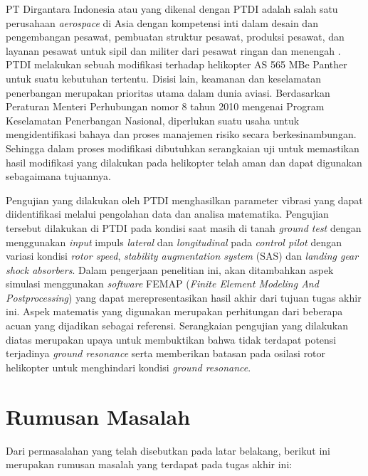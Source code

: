 PT Dirgantara Indonesia atau yang dikenal dengan PTDI adalah salah satu perusahaan \textit{aerospace} di Asia dengan kompetensi inti dalam desain dan pengembangan pesawat, pembuatan struktur pesawat, produksi pesawat, dan layanan pesawat untuk sipil dan militer dari pesawat ringan dan menengah \cite{PTDI}. PTDI melakukan sebuah modifikasi terhadap helikopter AS 565 MBe Panther untuk suatu kebutuhan tertentu. Disisi lain, keamanan dan keselamatan penerbangan merupakan prioritas utama dalam dunia aviasi. Berdasarkan Peraturan Menteri Perhubungan nomor 8 tahun 2010 mengenai Program Keselamatan Penerbangan Nasional, diperlukan suatu usaha untuk mengidentifikasi bahaya dan proses manajemen risiko secara berkesinambungan. Sehingga dalam proses modifikasi dibutuhkan serangkaian uji untuk memastikan hasil modifikasi yang dilakukan pada helikopter telah aman dan dapat digunakan sebagaimana tujuannya.

Pengujian yang dilakukan oleh PTDI menghasilkan parameter vibrasi yang dapat diidentifikasi melalui pengolahan data dan analisa matematika. Pengujian tersebut dilakukan di PTDI pada kondisi saat masih di tanah \textit{ground test} dengan menggunakan \textit{input} impuls \textit{lateral} dan \textit{longitudinal} pada \textit{control pilot} dengan variasi kondisi \textit{rotor speed}, \textit{stability augmentation system} (SAS) dan \textit{landing gear shock absorbers}. Dalam pengerjaan penelitian ini, akan ditambahkan aspek simulasi menggunakan \textit{software} FEMAP (\textit{Finite Element Modeling And Postprocessing}) yang dapat merepresentasikan hasil akhir dari tujuan tugas akhir ini. Aspek matematis yang digunakan merupakan perhitungan dari beberapa acuan yang dijadikan sebagai referensi. Serangkaian pengujian yang dilakukan diatas merupakan upaya untuk membuktikan bahwa tidak terdapat potensi terjadinya \textit{ground resonance} serta memberikan batasan pada osilasi rotor helikopter untuk menghindari kondisi \textit{ground resonance}.

\section{Rumusan Masalah}
\label{sec:rumusan masalah}

Dari permasalahan yang telah disebutkan pada latar belakang, berikut ini merupakan rumusan masalah yang terdapat pada tugas akhir ini:

